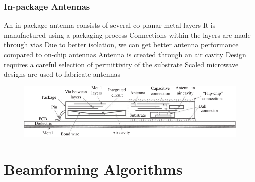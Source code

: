 \documentclass[10pt]{beamer}
\begin{document}


\begin{frame}
    \frametitle{In-package Antennas}
    \begin{outline}
        \1 An in-package antenna consists of several co-planar metal layers
        \1 It is manufactured using a packaging process
        \1 Connections within the layers are made through vias
        \1 Due to better isolation, we can get better antenna performance compared to on-chip antennas
        \1 Antenna is created through an air cavity
        \1 Design requires a careful selection of permittivity of the substrate
        \1 Scaled microwave designs are used to fabricate antennas
    \end{outline}
    \begin{figure}[htbp]
        \centering
        \includegraphics[width=.75\textwidth]{inpackage.pdf}
    \end{figure}
\end{frame}

\section{Beamforming Algorithms}
\end{document}
